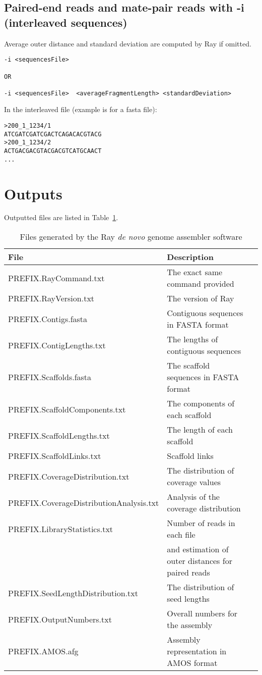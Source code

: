 \documentclass{article}
\begin{document}
\subsection{Paired-end reads and mate-pair reads with -i (interleaved sequences)}


Average outer distance and standard deviation are computed by Ray if omitted.

\begin{verbatim}
-i <sequencesFile>

OR

-i <sequencesFile>  <averageFragmentLength> <standardDeviation> 
\end{verbatim}

In the interleaved file (example is for a fasta file):

\begin{verbatim}
>200_1_1234/1
ATCGATCGATCGACTCAGACACGTACG
>200_1_1234/2
ACTGACGACGTACGACGTCATGCAACT
...
\end{verbatim}



\section{Outputs}

Outputted files are listed in Table~\ref{outputs}.

\begin{table}[h]
\caption{Files generated by the Ray \emph{de novo} genome assembler software}\label{outputs}
\begin{tabular}{lll}
\hline
File& Description\\
\hline
PREFIX.RayCommand.txt & The exact same command provided \\
PREFIX.RayVersion.txt & The version of Ray\\
PREFIX.Contigs.fasta & Contiguous sequences in FASTA format\\
PREFIX.ContigLengths.txt & The lengths of contiguous sequences\\
PREFIX.Scaffolds.fasta & The scaffold sequences in FASTA format \\
PREFIX.ScaffoldComponents.txt & The components of each scaffold\\
PREFIX.ScaffoldLengths.txt & The length of each scaffold \\
PREFIX.ScaffoldLinks.txt & Scaffold links \\
PREFIX.CoverageDistribution.txt & The distribution of coverage values \\
PREFIX.CoverageDistributionAnalysis.txt & Analysis of the coverage distribution \\
PREFIX.LibraryStatistics.txt & Number of reads in each file \\
 & and estimation of outer distances for paired reads \\
PREFIX.SeedLengthDistribution.txt & The distribution of seed lengths \\
PREFIX.OutputNumbers.txt & Overall numbers for the assembly\\
PREFIX.AMOS.afg & Assembly representation in AMOS format \\
\hline
\end{tabular}
\end{table}
\end{document}
